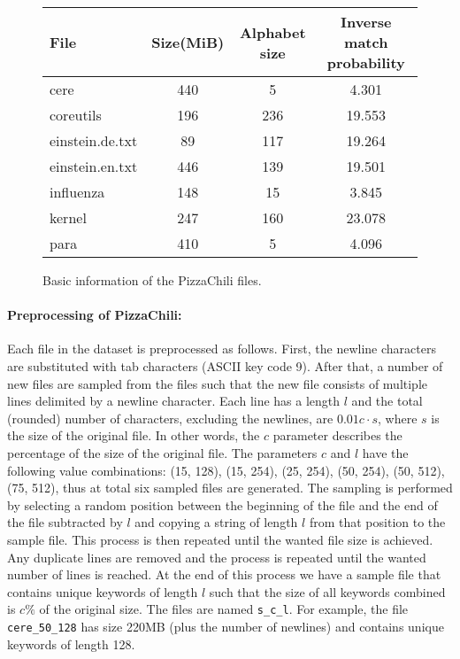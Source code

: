 \documentclass[english,twoside,censored,csm,algorithms-track-2020]{HYthesisML}
\theoremstyle{plain}
\theoremstyle{definition}
\begin{document}
\begin{figure}
\begin{center}
  \begin{tabular}{|l|c|c|c|}
    \hline
    \textbf{File} & \textbf{Size(MiB)} & \textbf{Alphabet size} & \textbf{Inverse match probability} \\
    \hline
    cere & 440 & 5 & 4.301 \\
    coreutils & 196 & 236 & 19.553 \\
    einstein.de.txt & 89 & 117 & 19.264 \\
    einstein.en.txt & 446 & 139 & 19.501 \\
    influenza & 148 & 15 & 3.845 \\
    kernel & 247 & 160 & 23.078 \\
    para & 410 & 5 & 4.096\\
    \hline
  \end{tabular}
  \caption{Basic information of the PizzaChili files. \citep{PizzaChili}}
  \label{tbl-pizzachili-info}
\end{center}
\end{figure}


\paragraph{Preprocessing of PizzaChili:}
Each file in the dataset is preprocessed as follows. First, the newline characters are substituted
with tab characters (ASCII key code 9). After that, a number of new files are sampled from the files
such that the new file consists of multiple lines delimited by a newline character. Each line has a
length $l$ and the total (rounded) number of characters, excluding the newlines, are $0.01c\cdot s$,
where $s$ is the size of the original file. In other words, the $c$ parameter describes the percentage
of the size of the original file. The parameters $c$ and $l$ have the following value
combinations: (15, 128), (15, 254), (25, 254), (50, 254), (50, 512), (75, 512), thus at total six
sampled files are generated. The sampling is performed by selecting a random position between
the beginning of the file and the end of the file subtracted by $l$ and copying a string of length
$l$ from that position to the sample file. This process is then repeated until the wanted file size is
achieved. Any duplicate lines are removed and the process is repeated until the wanted
number of lines is reached. At the end of this process we have a sample file that contains unique keywords of length
$l$ such that the size of all keywords combined is $c\%$ of the original size. The files are
named \texttt{s\_c\_l}. For example, the file \texttt{cere\_50\_128} has size 220MB
(plus the number of newlines) and contains unique keywords of length 128.
\end{document}
